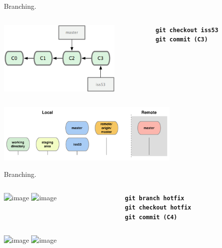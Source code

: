 \documentclass{beamer}
\begin{document}
\begin{frame}{Branching.}
  \begin{columns}
    \begin{column}{0.6\linewidth}
      \begin{center}
        \includegraphics[width=6cm]{figs/18333fig0312-tn}
      \end{center}
    \end{column}
    \begin{column}{0.4\linewidth}
      \begin{center}
        \texttt{\textbf{git checkout iss53}}\\
        \texttt{\textbf{git commit (C3)}}
      \end{center}
    \end{column}
  \end{columns}
  \begin{center}
    \includegraphics[width=9cm]{figs/git-checkout}
  \end{center}
\end{frame}

\begin{frame}{Branching.}
  \begin{columns}
    \begin{column}{0.6\linewidth}
      \begin{center}
        \includegraphics<1>[width=5.5cm]{figs/18333fig0313b-tn}
        \includegraphics<2>[width=5.5cm]{figs/18333fig0313-tn}
      \end{center}
    \end{column}
    \begin{column}{0.45\linewidth}
      \begin{center}
        \texttt{\textbf{git branch hotfix}}\\
        \texttt{\textbf{git checkout hotfix}}\\
        \texttt{\textbf{git commit (C4)}}\\
      \end{center}
    \end{column}
  \end{columns}
  \begin{center}
    \includegraphics<1>[width=9cm]{figs/git-branch2}
    \includegraphics<2>[width=9cm]{figs/git-checkout2}
  \end{center}
\end{frame}
\end{document}
